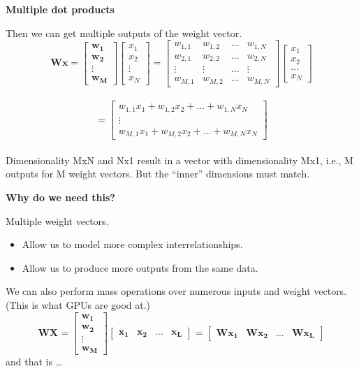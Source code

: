 \documentclass{beamer}
\newcommand{\pagestepalt}[2]{
  \begin{frame}[t]
    \begin{minipage}[t][0.26\textheight][t]{\textwidth}
      \begin{center}
        \huge
        \textbf{#1}
      \end{center}
    \end{minipage}
    
    \begin{minipage}[t][0.7\textheight][c]{\textwidth}
      #2
    \end{minipage}
  \end{frame}
}
\begin{document}
\pagestepalt{Multiple dot products}{
  \vspace{-0.75cm}
  Then we can get multiple outputs of the weight vector.
  \[
  \mathbf{W}\mathbf{x} =
  \begin{bmatrix}
    \mathbf{w_1} \\
    \mathbf{w_2} \\
    \vdots \\
    \mathbf{w_M} 
  \end{bmatrix}
  \begin{bmatrix}
    x_1 \\ x_2 \\ \vdots \\ x_N
  \end{bmatrix}
  =
  \begin{bmatrix}
    w_{1,1} & w_{1,2} & \ldots & w_{1,N} \\
    w_{2,1} & w_{2,2} & \ldots & w_{2,N} \\
    \vdots & \vdots & \ldots & \vdots \\
    w_{M,1} & w_{M,2} & \ldots & w_{M,N} 
  \end{bmatrix}
  \begin{bmatrix}
    x_1 \\ x_2 \\ \ldots \\ x_N
  \end{bmatrix}
  \]\pause\\
  \[
  =
  \begin{bmatrix}
      w_{1,1}x_1 + w_{1,2}x_2 + \ldots + w_{1,N}x_N \\ \vdots \\ w_{M,1}x_1 + w_{M,2}x_2 + \ldots + w_{M,N}x_N 
  \end{bmatrix}
  \]
  \\
  \pause
  Dimensionality MxN and Nx1 result in a vector with dimensionality Mx1, i.e.,
  M outputs for M weight vectors. But the ``inner'' dimensions must match.
}

\pagestepalt{Why do we need this?}{
  \pause Multiple weight vectors.
  \begin{itemize}
  \item Allow us to model more complex interrelationships.\pause
  \item Allow us to produce more outputs from the same data.\pause
  \end{itemize}
  We can also perform mass operations over numerous inputs and weight vectors.
  (This is what GPUs are good at.)\pause
  \[
  \mathbf{W}\mathbf{X} =
  \begin{bmatrix}
    \mathbf{w_1} \\
    \mathbf{w_2} \\
    \vdots\\
    \mathbf{w_M}    
  \end{bmatrix}
  \begin{bmatrix}
    \mathbf{x_1} & \mathbf{x_2} & \ldots & \mathbf{x_L}
  \end{bmatrix}
  =
  \begin{bmatrix}
    \mathbf{W}\mathbf{x_1} & \mathbf{W}\mathbf{x_2} & \ldots & \mathbf{W}\mathbf{x_L}
  \end{bmatrix}
  \]
  \pause and that is \ldots
}
\end{document}

